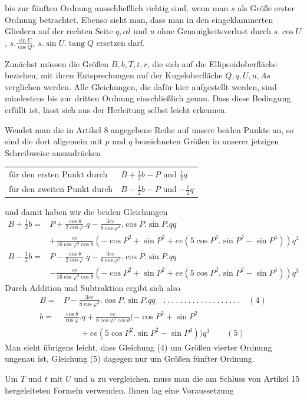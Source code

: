 %
bis zur fünften Ordnung ausschließlich richtig sind, wenn man \(s\) als Größe erster Ordnung betrachtet. Ebenso sieht man, dass man in den eingeklammerten Gliedern auf der rechten Seite \(q,\alpha l\) und \(u\) ohne Genauigkeitsverlust durch \(s\mathord{.}\cos U\), \(s\mathord{.}\frac{\sin U}{\cos Q}\), \(s\mathord{.}\sin U\mathord{.}\operatorname{tang}Q\) ersetzen darf.

Zunächst müssen die Größen \(B,b,T,t,r\), die sich auf die Ellipsoidoberfläche beziehen, mit ihren Entsprechungen auf der Kugeloberfläche \(Q,q,U,u,As\) verglichen werden. Alle Gleichungen, die dafür hier aufgestellt werden, sind mindestens bis zur dritten Ordnung einschließlich genau. Dass diese Bedingung erfüllt ist, lässt sich aus der Herleitung selbst leicht erkennen.

Wendet man die in Artikel 8 angegebene Reihe auf unsere beiden Punkte an, so sind die dort allgemein mit \(p\) und \(q\) bezeichneten Größen in unserer jetzigen Schreibweise auszudrücken
\begin{center}
\begin{tabular}{ll}
für den ersten Punkt durch & \(B+\frac12b-P\) und \(\frac12q\)\\
für den zweiten Punkt durch & \(B-\frac12b-P\) und \(-\frac12q\)
\end{tabular}
\end{center}
und damit haben wir die beiden Gleichungen
\begingroup\fontsize{10}{12}\selectfont
\[
\begin{aligned}
B+\tfrac12b={}&P+\frac{\cos\theta}{2\cos\varphi}\mathord{.}q-\frac{3ee}{8\cos\varphi^2}\mathord{.}\cos P\mathord{.}\sin P\mathord{.}qq\\
&+\frac{ee}{16\cos\varphi^3\cos\theta}(-\cos P^2+\sin P^2+ee(5\cos P^2\mathord{.}\sin P^2-\sin P^4))q^3\\
B-\tfrac12b={}&P-\frac{\cos\theta}{2\cos\varphi}\mathord{.}q-\frac{3ee}{8\cos\varphi^2}\mathord{.}\cos P\mathord{.}\sin P\mathord{.}qq\\
&-\frac{ee}{16\cos\varphi^3\cos\theta}(-\cos P^2+\sin P^2+ee(5\cos P^2\mathord{.}\sin P^2-\sin P^4))q^3
\end{aligned}
\]
\endgroup
Durch Addition und Subtraktion ergibt sich also
\[
\begin{aligned}
B={}&P-\frac{3ee}{8\cos\varphi^2}\mathord{.}\cos P\mathord{.}\sin P\mathord{.}qq\quad .\ .\ .\ .\ .\ .\ .\ .\ .\ .\ .\ .\ .\ .\ .\ .\ .\ .\ .\quad(4)\\
b={}&\frac{\cos\theta}{\cos\varphi}\mathord{.}q+\frac{ee}{8\cos\varphi^3\cos\theta}(-\cos P^2+\sin P^2\\
&\qquad+ee(5\cos P^2\mathord{.}\sin P^2-\sin P^4))q^3\qquad(5)
\end{aligned}
\]
Man sieht übrigens leicht, dass Gleichung (4) um Größen vierter Ordnung ungenau ist, Gleichung (5) dagegen nur um Größen fünfter Ordnung.

Um \(T\) und \(t\) mit \(U\) und \(u\) zu vergleichen, muss man die am Schluss von Artikel 15 hergeleiteten Formeln verwenden. Ihnen lag eine Voraussetzung
